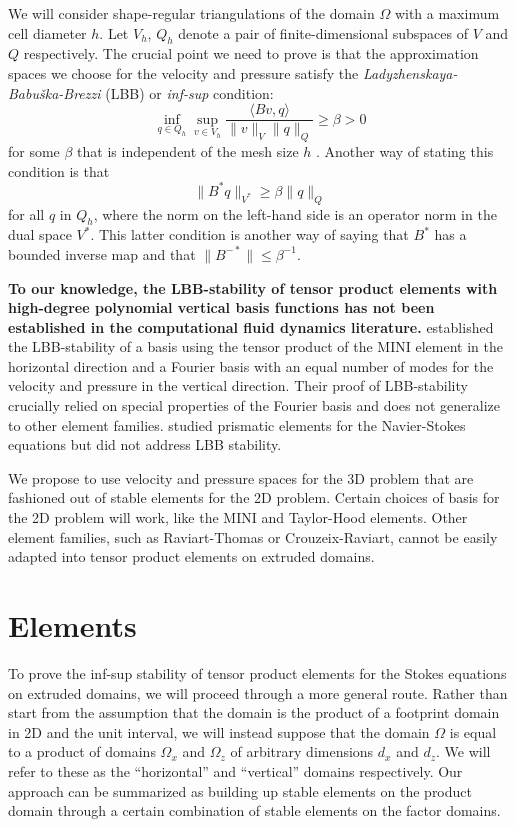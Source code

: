 \documentclass{article}
\theoremstyle{definition}
\theoremstyle{plain}
\begin{document}
We will consider shape-regular triangulations of the domain $\Omega$ with a maximum cell diameter $h$.
Let $V_h$, $Q_h$ denote a pair of finite-dimensional subspaces of $V$ and $Q$ respectively.
The crucial point we need to prove is that the approximation spaces we choose for the velocity and pressure satisfy the \emph{Ladyzhenskaya-Babu\v{s}ka-Brezzi} (LBB) or \emph{inf-sup} condition:
\begin{equation}
    \inf_{q\in Q_h}\sup_{v \in V_h}\frac{\langle Bv, q\rangle}{\|v\|_V\|q\|_Q} \ge \beta > 0
\end{equation}
for some $\beta$ that is independent of the mesh size $h$ \citep{boffi2013mixed}.
Another way of stating this condition is that
\begin{equation}
    \|B^*q\|_{V^*} \ge \beta\|q\|_Q
\end{equation}
for all $q$ in $Q_h$, where the norm on the left-hand side is an operator norm in the dual space $V^*$.
This latter condition is another way of saying that $B^*$ has a bounded inverse map and that $\|B^{-*}\| \le \beta^{-1}$.

\textbf{To our knowledge, the LBB-stability of tensor product elements with high-degree polynomial vertical basis functions has not been established in the computational fluid dynamics literature.}
\citet{canuto1984combined} established the LBB-stability of a basis using the tensor product of the MINI element in the horizontal direction and a Fourier basis with an equal number of modes for the velocity and pressure in the vertical direction.
Their proof of LBB-stability crucially relied on special properties of the Fourier basis and does not generalize to other element families.
\citet{nakahashi1989finite} studied prismatic elements for the Navier-Stokes equations but did not address LBB stability.

We propose to use velocity and pressure spaces for the 3D problem that are fashioned out of stable elements for the 2D problem.
Certain choices of basis for the 2D problem will work, like the MINI and Taylor-Hood elements.
Other element families, such as Raviart-Thomas or Crouzeix-Raviart, cannot be easily adapted into tensor product elements on extruded domains.


\section{Elements}

To prove the inf-sup stability of tensor product elements for the Stokes equations on extruded domains, we will proceed through a more general route.
Rather than start from the assumption that the domain is the product of a footprint domain in 2D and the unit interval, we will instead suppose that the domain $\Omega$ is equal to a product of domains $\Omega_x$ and $\Omega_z$ of arbitrary dimensions $d_x$ and $d_z$.
We will refer to these as the ``horizontal'' and ``vertical'' domains respectively.
Our approach can be summarized as building up stable elements on the product domain through a certain combination of stable elements on the factor domains.
\end{document}
